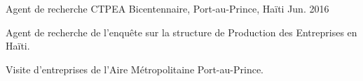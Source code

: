 \begin{cventries}
\cventry
{Agent de recherche} %
{CTPEA} %
{Bicentennaire, Port-au-Prince, Ha\"iti} %
{Jun. 2016} %
{ %
\begin{cvitems}
\item {Agent de recherche de l'enquête sur la structure de Production des Entreprises en Ha\"iti.}
\item {Visite d'entreprises de l'Aire Métropolitaine Port-au-Prince.}
\end{cvitems}
}


\end{cventries}
